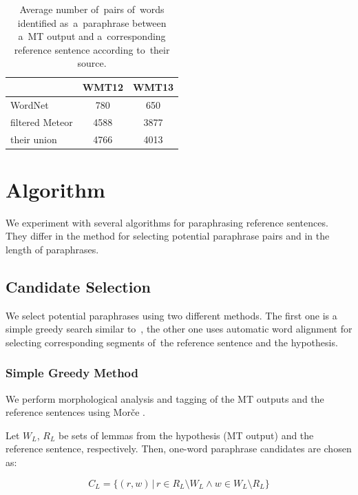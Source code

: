 \begin{table}[t]
\begin{center}
\begin{tabular}{l|cc}
& WMT12 & WMT13 \\
\hline
WordNet            &  780 & 650 \\
filtered Meteor    & 4588 & 3877 \\
their union        & 4766 & 4013 \\
\end{tabular}
\caption{Average number of~pairs of~words identified as~a~paraphrase between 
a~MT output and a~corresponding reference sentence according to~their source.}
\label{number_of_substitutions}
\end{center}
\end{table}

\section{Algorithm}
\label{algorithm}
We experiment with several algorithms for paraphrasing reference sentences. 
They differ in the method for selecting potential paraphrase pairs and in the 
length of paraphrases.

\subsection{Candidate Selection}
We select potential paraphrases using two different methods. The first one is a 
simple greedy search similar to~\citet{kauchak}, the other one uses automatic word
alignment for selecting corresponding segments of~the reference sentence and the 
hypothesis.

\subsubsection{Simple Greedy Method}
We perform morphological analysis and tagging of the MT outputs and
the reference sentences using Morče \cite{morce:2007}. 

Let $ W_{L} $, $ R_{L} $ be sets of lemmas
from the hypothesis (MT output) and the reference sentence, respectively. Then, one-word
paraphrase candidates are chosen as:

\begin{equation*}
C_{L} = \{(r,w) \, | \, r \in R_{L} \setminus W_{L} \wedge w \in W_{L} \setminus R_{L} \} 
\end{equation*}

